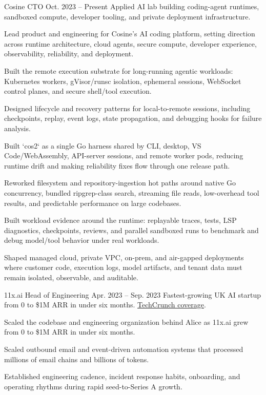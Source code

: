 
\ResumeJob
  {Cosine}
  {CTO}
  {Oct. 2023 -- Present}
  {Applied AI lab building coding-agent runtimes, sandboxed compute, developer tooling, and private deployment infrastructure.}
\begin{ResumeList}
  \item Lead product and engineering for Cosine's AI coding platform, setting direction across runtime architecture, cloud agents, secure compute, developer experience, observability, reliability, and deployment.
  \item Built the remote execution substrate for long-running agentic workloads: Kubernetes workers, gVisor/runsc isolation, ephemeral sessions, WebSocket control planes, and secure shell/tool execution.
  \item Designed lifecycle and recovery patterns for local-to-remote sessions, including checkpoints, replay, event logs, state propagation, and debugging hooks for failure analysis.
  \item Built `cos2` as a single Go harness shared by CLI, desktop, VS Code/WebAssembly, API-server sessions, and remote worker pods, reducing runtime drift and making reliability fixes flow through one release path.
  \item Reworked filesystem and repository-ingestion hot paths around native Go concurrency, bundled ripgrep-class search, streaming file reads, low-overhead tool results, and predictable performance on large codebases.
  \item Built workload evidence around the runtime: replayable traces, tests, LSP diagnostics, checkpoints, reviews, and parallel sandboxed runs to benchmark and debug model/tool behavior under real workloads.
  \item Shaped managed cloud, private VPC, on-prem, and air-gapped deployments where customer code, execution logs, model artifacts, and tenant data must remain isolated, observable, and auditable.
\end{ResumeList}

\ResumeJob
  {11x.ai}
  {Head of Engineering}
  {Apr. 2023 -- Sep. 2023}
  {Fastest-growing UK AI startup from 0 to \$1M ARR in under six months. \href{https://techcrunch.com/2023/08/11/11xai-closes-2-million-pre-seed-to-create-autonomous-ai-workers/}{TechCrunch coverage}.}
\begin{ResumeList}
  \item Scaled the codebase and engineering organization behind Alice as 11x.ai grew from 0 to \$1M ARR in under six months.
  \item Scaled outbound email and event-driven automation systems that processed millions of email chains and billions of tokens.
  \item Established engineering cadence, incident response habits, onboarding, and operating rhythms during rapid seed-to-Series A growth.
\end{ResumeList}

